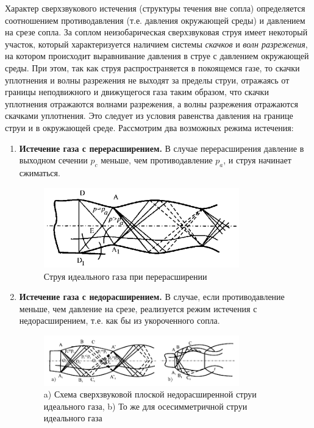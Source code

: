 \documentclass[a4paper,12pt]{article}
\begin{document}
Характер сверхзвукового истечения (структуры течения вне сопла) определяется соотношением противодавления (т.е. давления окружающей среды) и давлением на срезе сопла. За соплом неизобарическая сверхзвуковая струя имеет некоторый участок, который характеризуется наличием системы \textit{скачков} и \textit{волн разрежения}, на котором происходит выравнивание давления в струе с давлением окружающей среды. При этом, так как струя распространяется в покоящемся газе, то скачки уплотнения и волны разрежения не выходят за пределы струи, отражаясь от границы неподвижного и движущегося газа таким образом, что скачки уплотнения отражаются волнами разрежения, а волны разрежения отражаются скачками уплотнения. Это следует из условия равенства давления на границе струи и в окружающей среде. Рассмотрим два возможных режима истечения:
\begin{enumerate}
    \item \textbf{Истечение газа с перерасширением.}
    В случае перерасширения давление в выходном сечении $p_c$ меньше, чем противодавление $p_a$, и струя начинает сжиматься.
    \begin{figure}[H]\label{fig: overexpansion}
        \centering
        \includegraphics[width = 0.8\textwidth]{Перерасширение.png}
        \caption{Струя идеального газа при перерасширении}
    \end{figure}
    
    \item \textbf{Истечение газа с недорасширением.}  
    В случае, если противодавление меньше, чем давление на срезе, реализуется режим истечения с недорасширением, т.е. как бы из укороченного сопла.
    \begin{figure}[H]\label{fig: underexpansion}
        \centering
        \includegraphics[width = 0.8\textwidth]{Недорасширение.png}
        \caption{a) Схема сверхзвуковой плоской недорасширенной струи идеального газа, b) То же для осесимметричной струи идеального газа}
    \end{figure}
     
\end{enumerate}
\end{document}
